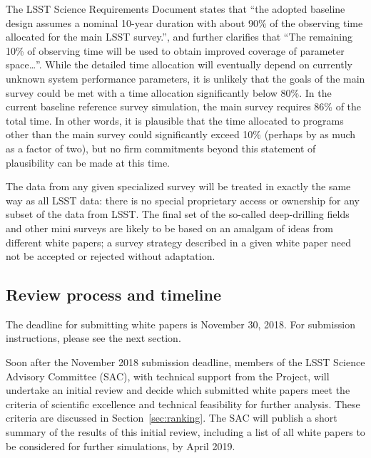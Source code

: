 \documentclass[DM,lsstdraft,toc,usenatbib]{lsstdoc}
\begin{document}
The LSST Science Requirements Document states that ``the adopted baseline design assumes a 
nominal 10-year duration with about 90\% of the observing time allocated for the main LSST survey.'',
and further clarifies that ``The remaining 10\% of observing time will be used to obtain improved 
coverage of parameter space\dots''. While the detailed time allocation will eventually depend on currently unknown system
performance parameters, it is unlikely that the goals of the main survey could be met with a time allocation
significantly below 80\%. In the current baseline reference survey simulation, the main survey requires 86\% of the total time.
In other words, it is plausible that the time allocated to programs other
than the main survey could significantly exceed 10\% (perhaps by as much as a factor of two), but 
no firm commitments beyond this statement of plausibility can be made at this time. 

The data from any given specialized survey will be treated in exactly the same way as all LSST 
data: there is no special proprietary access or ownership for any subset of the data from LSST. The final set of the so-called
deep-drilling fields and other mini surveys are likely to be based on an amalgam of ideas from different 
white papers; a survey strategy described in a given white paper need not be accepted or rejected without adaptation.


\subsection{Review process and timeline}

The deadline for submitting white papers is November 30, 2018. For submission instructions, 
please see the next section. 

Soon after the November 2018 submission deadline, members of the LSST Science Advisory Committee (SAC), 
with technical support from the Project, 
will undertake an initial review and decide which submitted white papers meet the criteria of scientific excellence and 
technical feasibility for further analysis. These criteria are discussed in Section~\ref{sec:ranking}. The SAC will publish 
a short summary of the results of this initial review, including a list of all white papers to be considered for further 
simulations, by April 2019. 
\end{document}
